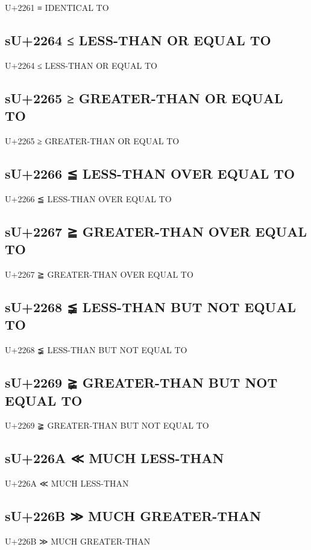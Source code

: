 U+2261 ≡ IDENTICAL TO

\subsection{sU+2264 ≤ LESS-THAN OR EQUAL TO}

U+2264 ≤ LESS-THAN OR EQUAL TO

\subsection{sU+2265 ≥ GREATER-THAN OR EQUAL TO}

U+2265 ≥ GREATER-THAN OR EQUAL TO

\subsection{sU+2266 ≦ LESS-THAN OVER EQUAL TO}

U+2266 ≦ LESS-THAN OVER EQUAL TO

\subsection{sU+2267 ≧ GREATER-THAN OVER EQUAL TO}

U+2267 ≧ GREATER-THAN OVER EQUAL TO

\subsection{sU+2268 ≨ LESS-THAN BUT NOT EQUAL TO}

U+2268 ≨ LESS-THAN BUT NOT EQUAL TO

\subsection{sU+2269 ≩ GREATER-THAN BUT NOT EQUAL TO}

U+2269 ≩ GREATER-THAN BUT NOT EQUAL TO

\subsection{sU+226A ≪ MUCH LESS-THAN}

U+226A ≪ MUCH LESS-THAN

\subsection{sU+226B ≫ MUCH GREATER-THAN}

U+226B ≫ MUCH GREATER-THAN

